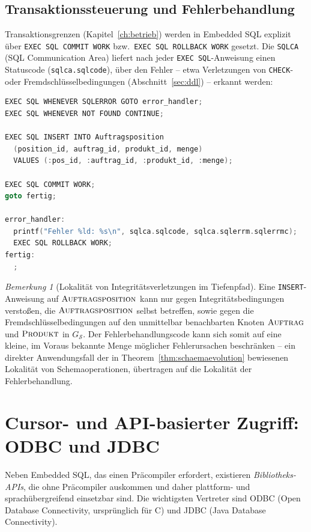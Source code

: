 ﻿\documentclass[a4paper,12pt]{report}
\theoremstyle{definition}
\theoremstyle{remark}
\newtheorem{remark}{Bemerkung}[chapter]
\begin{document}
\subsection{Transaktionssteuerung und Fehlerbehandlung}
\label{sec:embedded-transaktionen}

Transaktionsgrenzen (Kapitel~\ref{ch:betrieb}) werden in Embedded SQL
explizit über \texttt{EXEC SQL COMMIT WORK} bzw.\ \texttt{EXEC SQL
ROLLBACK WORK} gesetzt. Die \texttt{SQLCA} (SQL Communication Area)
liefert nach jeder \texttt{EXEC SQL}-Anweisung einen Statuscode
(\texttt{sqlca.sqlcode}), über den Fehler -- etwa Verletzungen von
\texttt{CHECK}- oder Fremdschlüsselbedingungen
(Abschnitt~\ref{sec:ddl}) -- erkannt werden:

\begin{lstlisting}[language=C]
EXEC SQL WHENEVER SQLERROR GOTO error_handler;
EXEC SQL WHENEVER NOT FOUND CONTINUE;

EXEC SQL INSERT INTO Auftragsposition
  (position_id, auftrag_id, produkt_id, menge)
  VALUES (:pos_id, :auftrag_id, :produkt_id, :menge);

EXEC SQL COMMIT WORK;
goto fertig;

error_handler:
  printf("Fehler %ld: %s\n", sqlca.sqlcode, sqlca.sqlerrm.sqlerrmc);
  EXEC SQL ROLLBACK WORK;
fertig:
  ;
\end{lstlisting}

\begin{remark}[Lokalität von Integritätsverletzungen im Tiefenpfad]
Eine \texttt{INSERT}-Anweisung auf $\textsc{Auftragsposition}$ kann
nur gegen Integritätsbedingungen verstoßen, die $\textsc{Auftragsposition}$
selbst betreffen, sowie gegen die Fremdschlüsselbedingungen auf den
unmittelbar benachbarten Knoten $\textsc{Auftrag}$ und
$\textsc{Produkt}$ in $G_{\mathcal{S}}$. Der Fehlerbehandlungscode kann
sich somit auf eine kleine, im Voraus bekannte Menge möglicher
Fehlerursachen beschränken -- ein direkter Anwendungsfall der in
Theorem~\ref{thm:schaemaevolution} bewiesenen Lokalität von
Schemaoperationen, übertragen auf die Lokalität der
Fehlerbehandlung.
\end{remark}

\section{Cursor- und API-basierter Zugriff: ODBC und JDBC}
\label{sec:odbc-jdbc}

Neben Embedded SQL, das einen Präcompiler erfordert, existieren
\emph{Bibliotheks-APIs}, die ohne Präcompiler auskommen und daher
plattform- und sprachübergreifend einsetzbar sind. Die wichtigsten
Vertreter sind ODBC (Open Database Connectivity, ursprünglich für C)
und JDBC (Java Database Connectivity).
\end{document}
